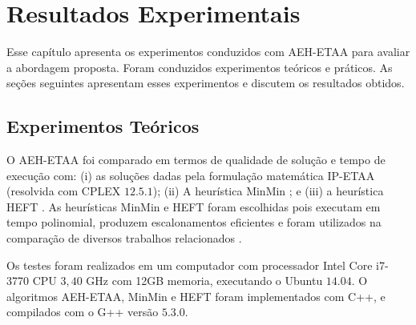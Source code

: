 \chapter{Resultados Experimentais}\label{chap6}


Esse capítulo apresenta os experimentos conduzidos com AEH-ETAA para avaliar a abordagem proposta. Foram conduzidos experimentos teóricos e práticos. As seções seguintes apresentam esses experimentos e discutem os resultados obtidos.



\section{Experimentos Teóricos}

O AEH-ETAA foi comparado em termos de qualidade de solução  e tempo de execução com: (i) as soluções dadas pela formulação matemática IP-ETAA (resolvida com CPLEX $12.5.1$); (ii) A heurística MinMin \cite{minmin}; e (iii) a heurística HEFT \cite{HEFT}. As heurísticas MinMin e HEFT foram escolhidas pois executam em tempo polinomial, produzem escalonamentos eficientes e foram utilizados na comparação de diversos trabalhos relacionados \cite{Rahman2007, Lopez, Yu2006}.

	
	
Os testes foram realizados em um computador com processador Intel Core i7-3770 CPU $3,40$ GHz com 12GB memoria, executando o Ubuntu $14.04$. O algoritmos AEH-ETAA, MinMin e HEFT foram implementados com C++, e compilados com o G++ versão $5.3.0$.

